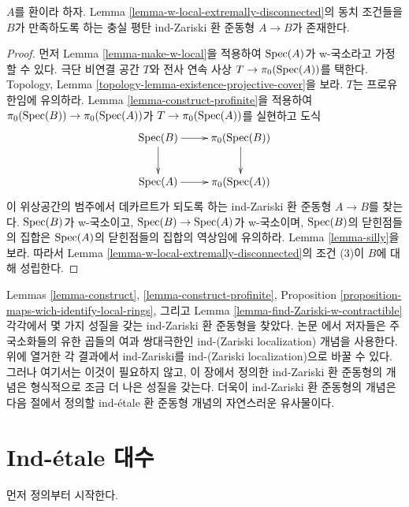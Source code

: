 \begin{lemma}
\label{lemma-find-Zariski-w-contractible}
$A$를 환이라 하자. Lemma
\ref{lemma-w-local-extremally-disconnected}의 동치 조건들을 $B$가
만족하도록 하는 충실 평탄 ind-Zariski 환 준동형 $A \to B$가 존재한다.
\end{lemma}

\begin{proof}
먼저 Lemma \ref{lemma-make-w-local}을 적용하여 $\mathop{\mathrm{Spec}}(A)$가
w-국소라고 가정할 수 있다. 극단 비연결 공간 $T$와 전사 연속 사상
$T \to \pi_0(\mathop{\mathrm{Spec}}(A))$를 택한다. Topology, Lemma
\ref{topology-lemma-existence-projective-cover}을 보라.
$T$는 프로유한임에 유의하라. Lemma \ref{lemma-construct-profinite}을
적용하여 $\pi_0(\mathop{\mathrm{Spec}}(B)) \to \pi_0(\mathop{\mathrm{Spec}}(A))$가
$T \to \pi_0(\mathop{\mathrm{Spec}}(A))$를 실현하고 도식
$$
\xymatrix{
\Spec(B) \ar[r] \ar[d] & \pi_0(\Spec(B)) \ar[d] \\
\Spec(A) \ar[r] & \pi_0(\Spec(A))
}
$$
이 위상공간의 범주에서 데카르트가 되도록 하는 ind-Zariski 환 준동형
$A \to B$를 찾는다. $\mathop{\mathrm{Spec}}(B)$가 w-국소이고,
$\mathop{\mathrm{Spec}}(B) \to \mathop{\mathrm{Spec}}(A)$가 w-국소이며, $\mathop{\mathrm{Spec}}(B)$의 닫힌점들의 집합은
$\mathop{\mathrm{Spec}}(A)$의 닫힌점들의 집합의 역상임에 유의하라.
Lemma \ref{lemma-silly}을 보라. 따라서 Lemma
\ref{lemma-w-local-extremally-disconnected}의 조건 (3)이 $B$에 대해 성립한다.
\end{proof}

\begin{remark}
\label{remark-slightly-stronger}
Lemmas \ref{lemma-construct}, \ref{lemma-construct-profinite},
Proposition \ref{proposition-maps-wich-identify-local-rings}, 그리고
Lemma \ref{lemma-find-Zariski-w-contractible} 각각에서 몇 가지 성질을
갖는 ind-Zariski 환 준동형을 찾았다. 논문 \cite{BS}에서 저자들은
주 국소화들의 유한 곱들의 여과 쌍대극한인 ind-(Zariski localization)
개념을 사용한다. 위에 열거한 각 결과에서 ind-Zariski를
ind-(Zariski localization)으로 바꿀 수 있다. 그러나 여기서는 이것이
필요하지 않고, 이 장에서 정의한 ind-Zariski 환 준동형의 개념은
형식적으로 조금 더 나은 성질을 갖는다. 더욱이 ind-Zariski 환 준동형의
개념은 다음 절에서 정의할 ind-\'etale 환 준동형 개념의 자연스러운
유사물이다.
\end{remark}




\section{Ind-\'etale 대수}
\label{section-ind-etale}

\noindent
먼저 정의부터 시작한다.

